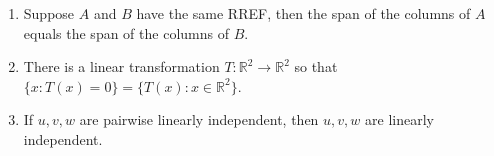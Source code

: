 \documentclass[12pt,letterpaper]{article}
\begin{document}
\begin{enumerate}
\begin{enumerate}
\item Suppose $A$ and $B$ have the same RREF, then the span of the columns of $A$ equals the span of the columns of $B$.
\item  There is a linear transformation $T : \mathbb{R}^2 \to \mathbb{R}^2$ so that $\{ x : T(x)=0 \} = \{ T(x) : x \in \mathbb{R}^2 \}.$
\item   If $u, v, w$ are pairwise linearly independent, then $u, v, w$ are linearly independent. 
\end{enumerate}


\end{enumerate}
\end{document}
